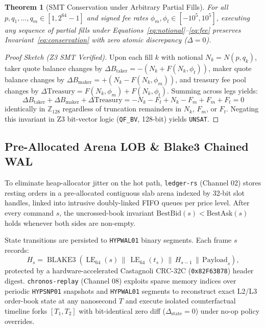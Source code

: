 \documentclass[10pt,twocolumn]{article}
\newtheorem{theorem}{Theorem}[section]
\begin{document}
\begin{theorem}[SMT Conservation under Arbitrary Partial Fills]
For all $p, q_1, \dots, q_m \in [1, 2^{64}-1]$ and signed fee rates $\phi_m, \phi_t \in [-10^5, 10^5]$, executing any sequence of partial fills under Equations~\eqref{eq:notional}--\eqref{eq:fee} preserves Invariant~\eqref{eq:conservation} with zero atomic discrepancy ($\Delta = 0$).
\end{theorem}
\begin{proof}[Proof Sketch (Z3 SMT Verified)]
Upon each fill $k$ with notional $N_k = N(p, q_k)$, taker quote balance changes by $\Delta B_{\text{taker}} = -(N_k + F(N_k, \phi_t))$, maker quote balance changes by $\Delta B_{\text{maker}} = +(N_k - F(N_k, \phi_m))$, and treasury fee pool changes by $\Delta \mathrm{Treasury} = F(N_k, \phi_m) + F(N_k, \phi_t)$. Summing across legs yields:
\[
  \Delta B_{\text{taker}} + \Delta B_{\text{maker}} + \Delta \mathrm{Treasury} = -N_k - F_t + N_k - F_m + F_m + F_t = 0
\]
identically in $\mathbb{Z}_{128}$ regardless of truncation remainders in $N_k$, $F_m$, or $F_t$. Negating this invariant in Z3 bit-vector logic (\texttt{QF\_BV}, 128-bit) yields \texttt{UNSAT}.
\end{proof}

\subsection{Pre-Allocated Arena LOB \& Blake3 Chained WAL}
To eliminate heap-allocator jitter on the hot path, \texttt{ledger-rs} (Channel 02) stores resting orders in a pre-allocated contiguous slab arena indexed by 32-bit slot handles, linked into intrusive doubly-linked FIFO queues per price level. After every command $s$, the uncrossed-book invariant $\mathrm{BestBid}(s) < \mathrm{BestAsk}(s)$ holds whenever both sides are non-empty.

State transitions are persisted to \texttt{HYPWAL01} binary segments. Each frame $s$ records:
\begin{equation}
  H_s = \operatorname{BLAKE3}\!\left( \operatorname{LE}_{64}(s) \,\|\, \operatorname{LE}_{64}(t_s) \,\|\, H_{s-1} \,\|\, \mathrm{Payload}_s \right),
\end{equation}
protected by a hardware-accelerated Castagnoli CRC-32C (\texttt{0x82F63B78}) header digest. \texttt{chronos-replay} (Channel 08) exploits sparse memory indices over periodic \texttt{HYPSNP01} snapshots and \texttt{HYPWAL01} segments to reconstruct exact L2/L3 order-book state at any nanosecond $T$ and execute isolated counterfactual timeline forks $[T_1, T_2]$ with bit-identical zero diff ($\Delta_{\text{state}} = 0$) under no-op policy overrides.
\end{document}

